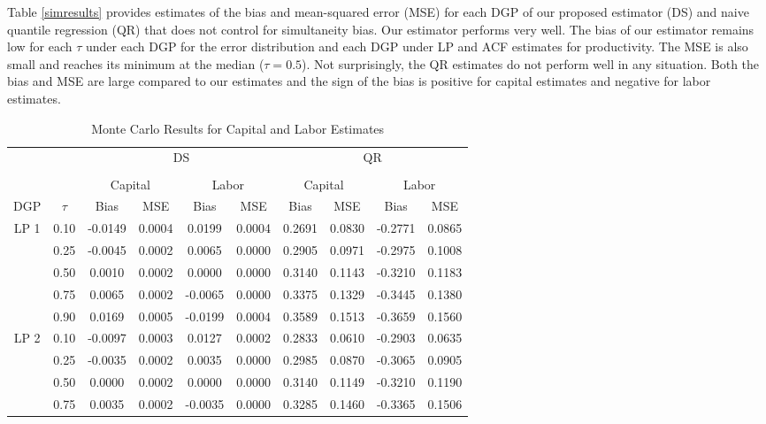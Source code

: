 \documentclass[11pt]{article}
\begin{document}
Table \ref{simresults} provides estimates of the bias and mean-squared error (MSE) for each DGP of our proposed estimator (DS) and naive quantile regression (QR) that does not control for simultaneity bias. Our estimator performs very well. The bias of our estimator remains low for each $\tau$ under each DGP for the error distribution and each DGP under LP and ACF estimates for productivity. The MSE is also small and reaches its minimum at the median ($\tau=0.5$). Not surprisingly, the QR estimates do not perform well in any situation. Both the bias and MSE are large compared to our estimates and the sign of the bias is positive for capital estimates and negative for labor estimates.

\pagebreak
\newpage

\begin{table}[H]
\centering
\caption{Monte Carlo Results for Capital and Labor Estimates}
\begin{tabular}{cccccccccc}
  \hline\hline & & & \multicolumn{2}{c}{DS} & & & \multicolumn{2}{c}{QR} \\ \cmidrule(lr){3-6} \cmidrule(lr){7-10} \\ & & \multicolumn{2}{c}{Capital} & \multicolumn{2}{c}{Labor} & \multicolumn{2}{c}{Capital} & \multicolumn{2}{c}{Labor} \\ \cmidrule(lr){3-4} \cmidrule(lr){5-6} \cmidrule(lr){7-8} \cmidrule(lr){9-10}DGP & $\tau$ & Bias & MSE & Bias & MSE & Bias & MSE & Bias & MSE \\ 
  \hline
LP 1 & 0.10 & -0.0149 & 0.0004 & 0.0199 & 0.0004 & 0.2691 & 0.0830 & -0.2771 & 0.0865 \\ 
   & 0.25 & -0.0045 & 0.0002 & 0.0065 & 0.0000 & 0.2905 & 0.0971 & -0.2975 & 0.1008 \\ 
   & 0.50 & 0.0010 & 0.0002 & 0.0000 & 0.0000 & 0.3140 & 0.1143 & -0.3210 & 0.1183 \\ 
   & 0.75 & 0.0065 & 0.0002 & -0.0065 & 0.0000 & 0.3375 & 0.1329 & -0.3445 & 0.1380 \\ 
   & 0.90 & 0.0169 & 0.0005 & -0.0199 & 0.0004 & 0.3589 & 0.1513 & -0.3659 & 0.1560 \\ 
  LP 2 & 0.10 & -0.0097 & 0.0003 & 0.0127 & 0.0002 & 0.2833 & 0.0610 & -0.2903 & 0.0635 \\ 
   & 0.25 & -0.0035 & 0.0002 & 0.0035 & 0.0000 & 0.2985 & 0.0870 & -0.3065 & 0.0905 \\ 
   & 0.50 & 0.0000 & 0.0002 & 0.0000 & 0.0000 & 0.3140 & 0.1149 & -0.3210 & 0.1190 \\ 
   & 0.75 & 0.0035 & 0.0002 & -0.0035 & 0.0000 & 0.3285 & 0.1460 & -0.3365 & 0.1506 \\ 

\end{tabular}
\end{table}
\end{document}
